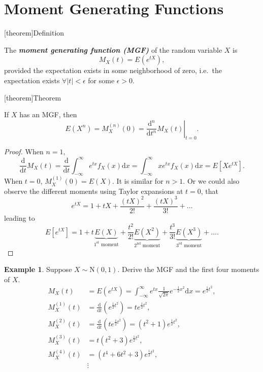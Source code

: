 \documentclass[12pt]{report}
\theoremstyle{definition}
\begin{document}
\section{Moment Generating Functions}

[theorem]{Definition}
\begin{mgf}
    The \textbf{\emph{moment generating function (MGF)}} of the random variable
    $X$ is
    \[
        M_X(t)=E\left(e^{tX}\right),
    \]
    provided the expectation exists in some neighborhood of zero, i.e.\ the
    expectation exists $\forall |t|<\epsilon$ for some $\epsilon>0$.
\end{mgf}

[theorem]{Theorem}
\begin{MGF regarding E(X)}
    If $X$ has an MGF, then
    \[
        E(X^{n})=M_X^{(n)}(0)=\left.\frac{\mathrm{d}^n}{\mathrm{d}t^n}M_X(t)\right|_{t=0}.
    \]
\end{MGF regarding E(X)}
\begin{proof}
    When $n=1$,
    \[
        \frac{\mathrm{d}}{\mathrm{d}t}M_X(t)=\frac{\mathrm{d}}{\mathrm{d}t}\int_{-\infty}^{\infty}
        e^{tx}f_X(x)\mathrm{d}x=\int_{-\infty}^{\infty}
        xe^{tx}f_X(x)\mathrm{d}x=E\left[Xe^{tX}\right].
    \]
    When $t=0$, $M_X^{(1)}(0)=E(X)$. It is similar for $n>1$.
    Or we could also observe the different moments using Taylor expansions at
    $t=0$, that
    \[
        e^{tX} =1+tX+\frac{{(tX)}^{2}}{2!}+\frac{{(tX)}^{3}}{3!}+\ldots
    \]
    leading to
    \[
        E\left[e^{tX}\right]=1+t \underbrace{E(X)}_{1^{\text{st}}\text{ moment}}
        +\frac{t^2}{2!}\underbrace{E(X^2)}_{2^{\text{nd}}\text{ moment}}
        +\frac{t^3}{3!}\underbrace{E(X^3)}_{3^{\text{rd}}\text{ moment}}+\ldots.
    \]
\end{proof} 

\newtheorem{MGF example}[theorem]{Example}
\begin{MGF example}
    Suppose $X\sim\text{N}(0,1)$. Derive the MGF and the first four moments of
    $X$.
    \begin{align*}
        M_X(t)&=E(e^{tX})=\int_{-\infty}^{\infty}
        e^{tx}\frac{1}{\sqrt{2\pi}}e^{-\frac{1}{2}x^2}\mathrm{d}x=e^{\frac{1}{2}t^2},\\
        M_X^{(1)}(t)&=\frac{\mathrm{d}}{\mathrm{d}t}\left(e^{\frac{1}{2}t^2}\right)=te^{\frac{1}{2}t^2},\\
        M_X^{(2)}(t)&=\frac{\mathrm{d}}{\mathrm{d}t}\left(te^{\frac{1}{2}t^2}\right)=(t^2+1)e^{\frac{1}{2}t^2},\\
        M_X^{(3)}(t)&=t(t^2+3)e^{\frac{1}{2}t^2},\\
        M_X^{(4)}(t)&=(t^4+6t^2+3)e^{\frac{1}{2}t^2},\\
                    &\vdots
    \end{align*} 
\end{MGF example}
\end{document}
